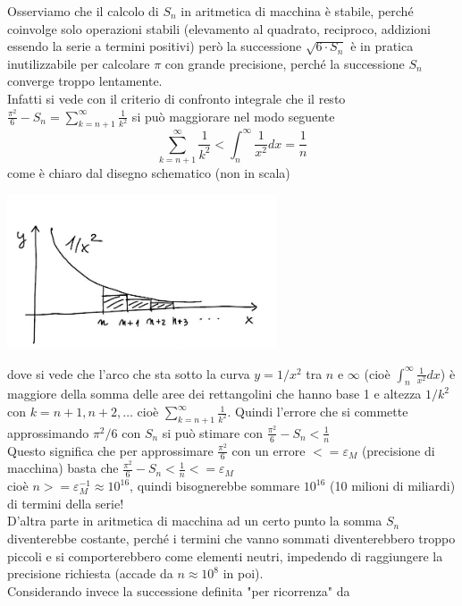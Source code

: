 \documentclass[12pt]{article}
\begin{document}
Osserviamo che il calcolo di $S_n$ in aritmetica di macchina è stabile, perché coinvolge solo operazioni stabili (elevamento al quadrato, reciproco, addizioni essendo la serie a termini positivi) però la successione $\sqrt{6\cdot S_n}$ è
in pratica inutilizzabile per calcolare $\pi$ con grande precisione, perché la successione $S_n$ converge troppo lentamente.\\
Infatti si vede con il criterio di confronto integrale che il resto $\frac{\pi^2}{6} - S_n = \sum\limits_{k=n+1}^\infty \frac{1}{k^2}$ si può maggiorare nel modo seguente
\begin{equation}
        \sum\limits_{k=n+1}^\infty \frac{1}{k^2} < \int_n^\infty \frac{1}{x^2} dx = \frac{1}{n}
\end{equation}
come è chiaro dal disegno schematico (non in scala)\\
\begin{center}
    \includegraphics[width=0.6\textwidth]{pag24.jpg}
\end{center}
dove si vede che l'arco che sta sotto la curva $y=1/x^2$ tra $n$ e $\infty$ (cioè $\int_n^\infty \frac{1}{x^2}dx$) è maggiore della somma delle aree dei rettangolini che hanno base 1 e altezza $1/k^2$ con $k = n+1, n+2, \dotso$ cioè $\sum\limits_{k=n+1}^\infty \frac{1}{k^2}$. Quindi l'errore che si commette approssimando $\pi^2/6$ con $S_n$
si può stimare con $\frac{\pi^2}{6}-S_n < \frac{1}{n}$\\
Questo significa che per approssimare $\frac{\pi^2}{6}$ con un errore $<= \varepsilon_M$ (precisione di macchina) basta che $\frac{\pi^2}{6}-S_n < \frac{1}{n} <= \varepsilon_M$\\
cioè $n>=\varepsilon_M^{-1} \approx 10^{16}$, quindi bisognerebbe sommare $10^{16}$ (10 milioni di miliardi) di termini della serie!\\
D'altra parte in aritmetica di macchina ad un certo punto 
la somma $S_n$ diventerebbe costante, perché i termini che vanno sommati diventerebbero troppo piccoli e si comporterebbero come elementi neutri, impedendo di raggiungere la precisione richiesta (accade da $n\approx10^8$ in poi).\\ Considerando invece la successione definita "per ricorrenza" da\\\\
\end{document}
